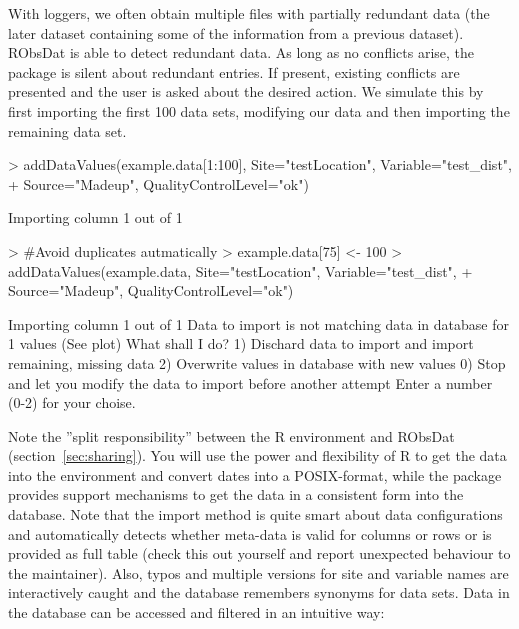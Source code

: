 \documentclass[a4paper]{article}
\begin{document}
With loggers, we often obtain multiple files with
partially redundant data (the later dataset
containing some of the information from a previous
dataset). RObsDat is able to detect redundant
data. As long as no conflicts arise, the package
is silent about redundant entries. If present, existing
conflicts are presented and the user is asked
about the desired action. We simulate this by
first importing the first 100 data sets, modifying
our data and then importing the remaining data
set.

\begin{Schunk}
\begin{Sinput}
> addDataValues(example.data[1:100], Site="testLocation", Variable="test_dist",  
+ 	Source="Madeup", QualityControlLevel="ok")
\end{Sinput}
\begin{Soutput}
Importing column  1 out of 1 
\end{Soutput}
\begin{Sinput}
> #Avoid duplicates autmatically
> example.data[75] <- 100
> addDataValues(example.data, Site="testLocation", Variable="test_dist",  
+ 	Source="Madeup", QualityControlLevel="ok")
\end{Sinput}
\begin{Soutput}
Importing column  1 out of 1 
Data to import is not matching data in database for 1 values (See plot)
What shall I do?
  1) Dischard data to import and import remaining, missing data
  2) Overwrite values in database with new values
  0) Stop and let you modify the data to import before another attempt
Enter a number (0-2) for your choise.
\end{Soutput}
\end{Schunk}

Note the ''split
responsibility'' between the R environment and
RObsDat (section~\ref{sec:sharing}). 
You will use the power and flexibility of
R to get the data into the environment and convert
dates into a POSIX-format, while the package
provides support mechanisms to get the data in a
consistent form into the database.
Note that the import method is quite smart about
data configurations and automatically detects
whether meta-data is valid for columns or rows or
is provided as full table (check this out yourself
and report unexpected behaviour to the maintainer).
Also, typos and multiple versions for site and
variable names are interactively caught and the
database remembers synonyms for data sets.
Data in the database can be accessed and filtered
in an intuitive way:
\end{document}
